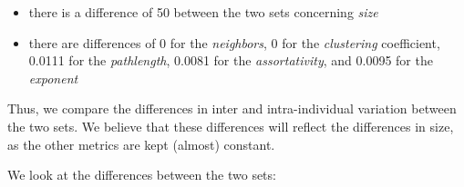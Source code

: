 \documentclass[
]{article}
\providecommand{\tightlist}{%
  \setlength{\itemsep}{0pt}\setlength{\parskip}{0pt}}
\begin{document}
\begin{itemize}
\tightlist
\item
  there is a difference of 50 between the two sets concerning
  \emph{size}
\item
  there are differences of 0 for the \emph{neighbors}, 0 for the
  \emph{clustering} coefficient, 0.0111 for the \emph{pathlength},
  0.0081 for the \emph{assortativity}, and 0.0095 for the
  \emph{exponent}
\end{itemize}

Thus, we compare the differences in inter and intra-individual variation
between the two sets. We believe that these differences will reflect the
differences in size, as the other metrics are kept (almost) constant.

We look at the differences between the two sets:
\end{document}
